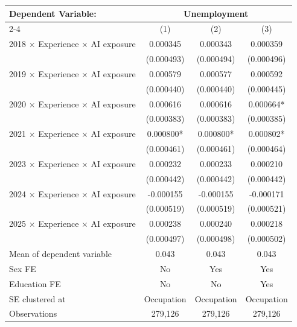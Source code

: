 \def\sym#1{\ifmmode^{#1}\else\(^{#1}\)\fi}
\begin{tabular}{l*{3}{c}}
\toprule
Dependent Variable: & \multicolumn{3}{c}{Unemployment} \\
\cmidrule(lr){2-4}
 & (1) & (2) & (3) \\
\midrule
2018 $\times$ Experience $\times$ AI exposure&    0.000345   &    0.000343   &    0.000359   \\
            &  (0.000493)   &  (0.000494)   &  (0.000496)   \\
2019 $\times$ Experience $\times$ AI exposure&    0.000579   &    0.000577   &    0.000592   \\
            &  (0.000440)   &  (0.000440)   &  (0.000445)   \\
2020 $\times$ Experience $\times$ AI exposure&    0.000616   &    0.000616   &    0.000664*  \\
            &  (0.000383)   &  (0.000383)   &  (0.000385)   \\
2021 $\times$ Experience $\times$ AI exposure&    0.000800*  &    0.000800*  &    0.000802*  \\
            &  (0.000461)   &  (0.000461)   &  (0.000464)   \\
2023 $\times$ Experience $\times$ AI exposure&    0.000232   &    0.000233   &    0.000210   \\
            &  (0.000442)   &  (0.000442)   &  (0.000442)   \\
2024 $\times$ Experience $\times$ AI exposure&   -0.000155   &   -0.000155   &   -0.000171   \\
            &  (0.000519)   &  (0.000519)   &  (0.000521)   \\
2025 $\times$ Experience $\times$ AI exposure&    0.000238   &    0.000240   &    0.000218   \\
            &  (0.000497)   &  (0.000498)   &  (0.000502)   \\
\midrule
Mean of dependent variable&       0.043   &       0.043   &       0.043   \\
Sex FE      &          No   &         Yes   &         Yes   \\
Education FE&          No   &          No   &         Yes   \\
SE clustered at&  Occupation   &  Occupation   &  Occupation   \\
Observations&     279,126   &     279,126   &     279,126   \\
\bottomrule
\end{tabular}

